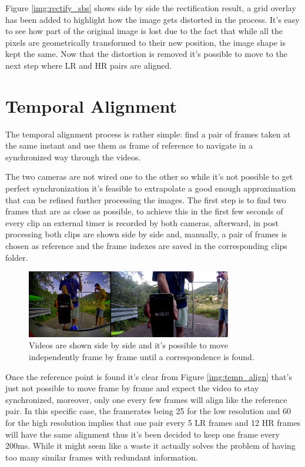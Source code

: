 Figure \ref{img:rectify_sbs} shows side by side the rectification result, a grid overlay has been added to highlight how the image gets distorted in the process. It's easy to see how part of the original image is lost due to the fact that while all the pixels are geometrically transformed to their new position, the image shape is kept the same. Now that the distortion is removed it's possible to move to the next step where LR and HR pairs are aligned.

\section{Temporal Alignment}
\label{sec:temp_align}

The temporal alignment process is rather simple: find a pair of frames taken at the same instant and use them as frame of reference to navigate in a synchronized way through the videos.

The two cameras are not wired one to the other so while it's not possible to get perfect synchronization it's feasible to extrapolate a good enough approximation that can be refined further processing the images. The first step is to find two frames that are as close as possible, to achieve this in the first few seconds of every clip an external timer is recorded by both cameras, afterward, in post processing both clips are shown side by side and, manually, a pair of frames is chosen as reference and the frame indexes are saved in the corresponding clips folder.

\begin{figure}[H]
  \centering
  \includegraphics[width=0.8\textwidth]{figures/time_sync_kp.png}
  \caption{Videos are shown side by side and it's possible to move independently frame by frame until a correspondence is found.}
  \label{img:time_sync}
\end{figure}

Once the reference point is found it's clear from Figure \ref{img:temp_align} that's just not possible to move frame by frame and expect the video to stay synchronized, moreover, only one every few frames will align like the reference pair. In this specific case, the framerates being 25 for the low resolution and 60 for the high resolution implies that one pair every 5 LR frames and 12 HR frames will have the same alignment thus it's been decided to keep one frame every 200ms. While it might seem like a waste it actually solves the problem of having too many similar frames with redundant information.

